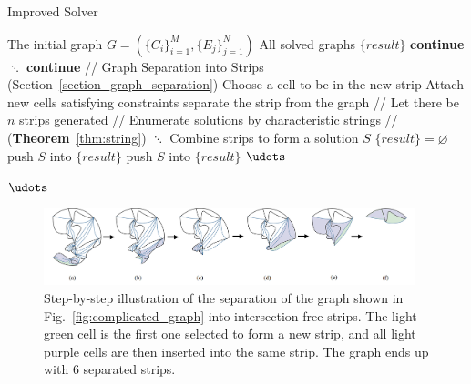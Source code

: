 \documentclass[journal]{IEEEtran}
\begin{document}
\begin{algorithm}[t]
    \caption{Improved Solver}\label{alg:1}
    \begin{algorithmic}[1]
        \Require The initial graph $G = (\{C_i\}_{i = 1}^M, \{E_j\}_{j = 1}^N)$  
        \Ensure All solved graphs $\{result\}$  
\State \textbf{continue}
\EndIf
\State $\ddots$
	\State \textbf{continue}
	\EndIf
	\State // Graph Separation into Strips (Section~\ref{section_graph_separation})
		\label{alg:separation_start}
		\State Choose a cell to be in the new strip
		\State Attach new cells satisfying constraints
		\State separate the strip from the graph
		\EndWhile\label{alg:separation_end}
		\State // Let there be $n$ strips generated
		\State // Enumerate solutions by characteristic strings 
		\State // (\textbf{Theorem}~\ref{thm:string})
		\State $\ddots$
		\State Combine strips to form a solution $S$\label{alg:combining_start}
		\State $\{result\} = \varnothing$
		\State push $S$ into $\{result\}$
		\Else
			\State push $S$ into $\{result\}$
		\EndIf
		\EndIf\label{alg:combining_end}
		\EndFor
		\State $\udots$
		\EndFor

	\EndFor
\State $\udots$
\EndFor%
    \end{algorithmic}  
\end{algorithm}


\begin{figure}[t]
\centering
\includegraphics[width=0.96\textwidth]{figures/steps_2}
\caption{Step-by-step illustration of the separation of the graph shown in Fig.~\ref{fig:complicated_graph} into intersection-free strips. The light green cell is the first one selected to form a new strip, and all light purple cells are then inserted into the same strip. The graph ends up with $6$ separated strips.}
\label{fig:steps}
\end{figure}
\end{document}
